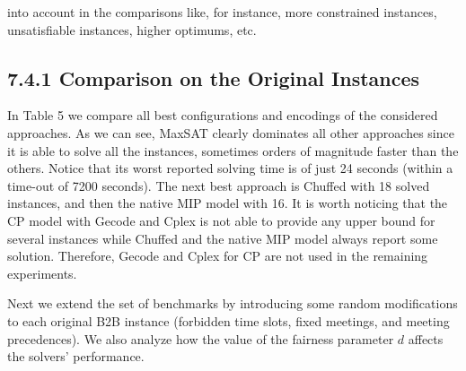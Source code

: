 \documentclass[10pt]{article}
\begin{document}
into account in the comparisons like, for instance, more constrained instances, unsatisfiable instances, higher optimums, etc.

\subsection*{7.4.1 Comparison on the Original Instances}
In Table 5 we compare all best configurations and encodings of the considered approaches. As we can see, MaxSAT clearly dominates all other approaches since it is able to solve all the instances, sometimes orders of magnitude faster than the others. Notice that its worst reported solving time is of just 24 seconds (within a time-out of 7200 seconds). The next best approach is Chuffed with 18 solved instances, and then the native MIP model with 16. It is worth noticing that the CP model with Gecode and Cplex is not able to provide any upper bound for several instances while Chuffed and the native MIP model always report some solution. Therefore, Gecode and Cplex for CP are not used in the remaining experiments.

Next we extend the set of benchmarks by introducing some random modifications to each original B2B instance (forbidden time slots, fixed meetings, and meeting precedences). We also analyze how the value of the fairness parameter $d$ affects the solvers' performance.
\end{document}
